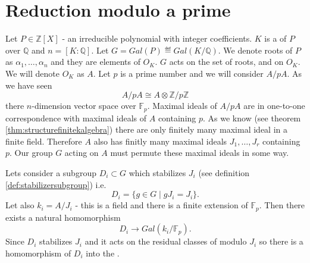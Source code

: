 \section{Reduction modulo a prime}

Let $P \in \mathbb{Z}\left[X\right]$ - an irreducible polynomial with integer
coefficients. $K$ is a  of $P$ over
$\mathbb{Q}$ and $n = \left[K:\mathbb{Q}\right]$. Let
$G = Gal\left(P\right) \eqdef Gal\left(K/\mathbb{Q}\right)$. We denote
roots of $P$ as $\alpha_1, \dots, \alpha_n$ and they are elements of
$O_K$. $G$ acts on the set of roots, and on $O_K$. We will denote
$O_K$ as $A$. Let $p$ is a prime number and we will consider $A/pA$.
As we have seen
\[
A/pA \cong A \otimes \mathbb{Z}/p\mathbb{Z}
\]
there $n$-dimension vector space over $\mathbb{F}_p$. Maximal ideals
of $A/pA$ are in one-to-one correspondence with maximal ideals of $A$
containing $p$. As we know (see theorem
\ref{thm:structurefinitekalgebra}) there are only finitely many
maximal ideal in a finite field. Therefore $A$ also has finitly many
maximal ideals $J_1, \dots, J_r$ containing $p$. Our group $G$ acting
on $A$ must permute these maximal ideals in some way.

Lets consider a subgroup $D_i \subset G$ which stabilizes $J_i$ (see
definition \ref{def:stabilizersubgroup}) i.e.
\[
D_i = \{g \in G \mid g J_i = J_i\}.
\]
Let also $k_i = A/J_i$ - this is a field and there is a finite
extension of $\mathbb{F}_p$. Then there exists a natural homomorphism
\[
D_i \to Gal\left(k_i/\mathbb{F}_p\right).
\]
Since $D_i$ stabilizes $J_i$ and it acts on the residual classes of
modulo $J_i$ so there is a homomorphism of $D_i$ into the
.

